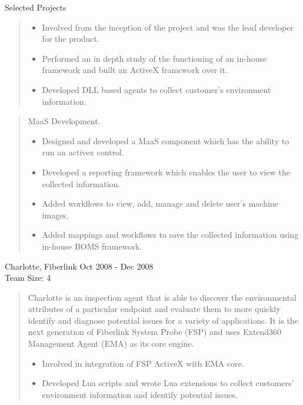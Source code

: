 \documentclass{resume}
\newcommand{\teamsize}{\\\sc\footnotesize Team Size: }
\begin{document}
\begin{category}{Selected Projects}{}
\begin{quote}
            \begin{itemize}
                \item Involved from the inception of the project and was the
                    lead developer for the product.
                \item Performed an in depth study of the functioning of an
                    in-house framework and built an ActiveX framework over it.
                \item Developed DLL based agents to collect customer’s
                    environment information.
            \end{itemize}
        \end{quote}
        \begin{quote}
            MaaS Development.
            \begin{itemize}
                \item Designed and developed a MaaS component which has the
                    ability to run an activex control.
                \item Developed a reporting framework which enables the user to
                    view the collected information.
                \item Added workflows to view, add, manage and delete user's
                    machine images.
                \item Added mappings and workflows to save the collected
                    information using in-house BOMS framework.
            \end{itemize}
        \end{quote}

    \pagebreak

    \item {\topic Charlotte,} Fiberlink
        {\period Oct 2008 - Dec 2008}
	{\teamsize 4}
        \begin{quote}
            Charlotte is an inspection agent that is able to discover the
            environmental attributes of a particular endpoint and evaluate them
            to more quickly identify and diagnose potential issues for a
            variety of applications. It is the next generation of Fiberlink
            System Probe (FSP) and uses Extend360 Management Agent (EMA) as its
            core engine.
            \begin{itemize}
                \item Involved in integration of FSP ActiveX with EMA core.
                \item Developed Lua scripts and wrote Lua extensions to collect
                    customers' environment information and identify potential
                    issues.
            \end{itemize}
        \end{quote}


\end{category}
\end{document}
